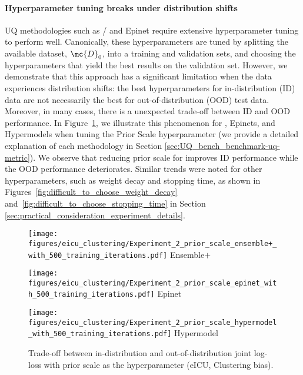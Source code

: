 \paragraph{Hyperparameter tuning breaks under distribution shifts} 
UQ methodologies such as \ensembles/ \ensembleplus and Epinet require extensive hyperparameter tuning to perform well. Canonically, these hyperparameters are tuned by splitting the available dataset, $\mc{D}_0$, into a training and validation sets, and choosing the hyperparameters that yield the best results on the validation set.
However, we demonstrate that this approach has a significant limitation when the data experiences distribution shifts: the best hyperparameters for in-distribution (ID) data are not necessarily the best for out-of-distribution (OOD) test data. 
Moreover, in many cases, there is a unexpected trade-off between ID and OOD performance. In Figure~\ref{fig:difficult_to_choose_prior_scale}, we illustrate this phenomenon for  \ensembleplus, Epinets, and Hypermodels 
when tuning the Prior Scale hyperparameter (we provide a detailed explanation of each methodology in Section \ref{sec:UQ_bench_benchmark-uq-metric}). We observe that reducing prior scale for \ensembleplus improves ID  performance while the OOD performance deteriorates. Similar trends were noted for other hyperparameters, such as weight decay and stopping time, as shown in Figures~\ref{fig:difficult_to_choose_weight_decay} and~\ref{fig:difficult_to_choose_stopping_time} in Section \ref{sec:practical_consideration_experiment_details}.




\begin{figure}[h]
\centering
\begin{minipage}[b]{0.32\textwidth}
\centering
\texttt{[image: figures/eicu\_clustering/Experiment\_2\_prior\_scale\_ensemble+\_with\_500\_training\_iterations.pdf]}
{\small{\centering Ensemble$+$}}
\end{minipage}
\hfill
\begin{minipage}[b]{0.32\textwidth}
\centering \texttt{[image: figures/eicu\_clustering/Experiment\_2\_prior\_scale\_epinet\_with\_500\_training\_iterations.pdf]}
{\small{\centering Epinet}}
\end{minipage}
\hfill
\begin{minipage}[b]{0.32\textwidth}
\centering \texttt{[image: figures/eicu\_clustering/Experiment\_2\_prior\_scale\_hypermodel\_with\_500\_training\_iterations.pdf]}
{\small{\centering Hypermodel}}
\end{minipage}
\caption{Trade-off between  in-distribution and out-of-distribution joint log-loss with prior scale as the hyperparameter (eICU, Clustering bias).} \label{fig:difficult_to_choose_prior_scale}
\end{figure}



